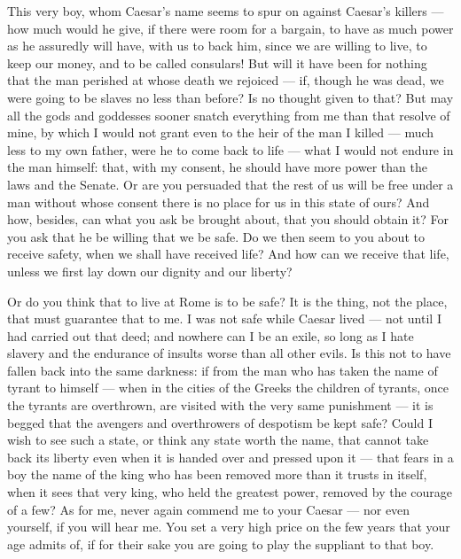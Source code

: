  This very boy, whom Caesar's name seems to spur on against Caesar's killers --- how much would he give, if there were room for a bargain, to have as much power as he assuredly will have, with us to back him, since we are willing to live, to keep our money, and to be called consulars! But will it have been for nothing that the man perished at whose death we rejoiced --- if, though he was dead, we were going to be slaves no less than before? Is no thought given to that? But may all the gods and goddesses sooner snatch everything from me than that resolve of mine, by which I would not grant even to the heir of the man I killed --- much less to my own father, were he to come back to life --- what I would not endure in the man himself: that, with my consent, he should have more power than the laws and the Senate. Or are you persuaded that the rest of us will be free under a man without whose consent there is no place for us in this state of ours? And how, besides, can what you ask be brought about, that you should obtain it? For you ask that he be willing that we be safe. Do we then seem to you about to receive safety, when we shall have received life? And how can we receive that life, unless we first lay down our dignity and our liberty?

 Or do you think that to live at Rome is to be safe? It is the thing, not the place, that must guarantee that to me. I was not safe while Caesar lived --- not until I had carried out that deed; and nowhere can I be an exile, so long as I hate slavery and the endurance of insults worse than all other evils. Is this not to have fallen back into the same darkness: if from the man who has taken the name of tyrant to himself --- when in the cities of the Greeks the children of tyrants, once the tyrants are overthrown, are visited with the very same punishment --- it is begged that the avengers and overthrowers of despotism be kept safe? Could I wish to see such a state, or think any state worth the name, that cannot take back its liberty even when it is handed over and pressed upon it --- that fears in a boy the name of the king who has been removed more than it trusts in itself, when it sees that very king, who held the greatest power, removed by the courage of a few? As for me, never again commend me to your Caesar --- nor even yourself, if you will hear me. You set a very high price on the few years that your age admits of, if for their sake you are going to play the suppliant to that boy.

